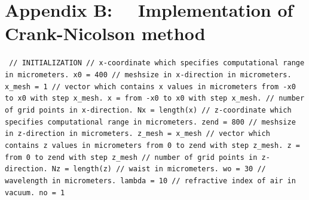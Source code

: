 \documentclass[a4paper]{article}
\begin{document}
	\section*{Appendix B: ~~Implementation of Crank-Nicolson method}
		\texttt{\noindent
			\textcolor{OliveGreen}{// INITIALIZATION\newline\newline
		// x-coordinate which specifies computational range in micrometers.}\newline
		x0 = 400 \newline
		\textcolor{OliveGreen}{// meshsize in x-direction in micrometers.}\newline
		x\_mesh = 1 \newline
		\textcolor{OliveGreen}{// vector which contains x values in micrometers from -x0 to x0 with step x\_mesh.}\newline
		x = from -x0 to x0 with step x\_mesh.\newline
		\textcolor{OliveGreen}{// number of grid points in x-direction.}\newline
		Nx = length(x)\newline\newline
		\textcolor{OliveGreen}{// z-coordinate which specifies computational range in micrometers.}\newline
		zend = 800 \newline
		\textcolor{OliveGreen}{// meshsize in z-direction in micrometers.}\newline
		z\_mesh = x\_mesh \newline
		\textcolor{OliveGreen}{// vector which contains z values in micrometers from 0 to zend with step z\_mesh.}\newline
		z = from 0 to zend with step z\_mesh\newline
		\textcolor{OliveGreen}{// number of grid points in z-direction.}\newline
		Nz = length(z)\newline
		\textcolor{OliveGreen}{// waist in micrometers.}\newline
		wo = 30 \newline
		\textcolor{OliveGreen}{// wavelength in micrometers.}\newline
		lambda = 10\newline
		\textcolor{OliveGreen}{// refractive index of air in vacuum.}\newline
		no = 1\newline
}
\end{document}
